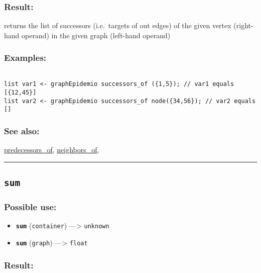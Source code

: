 \documentclass[]{book}
\providecommand{\tightlist}{%
  \setlength{\itemsep}{0pt}\setlength{\parskip}{0pt}}
\theoremstyle{definition}
\theoremstyle{definition}
\theoremstyle{definition}
\theoremstyle{remark}
\begin{document}
\subsubsection{Result:}\label{result-491}

returns the list of successors (i.e.~targets of out edges) of the given
vertex (right-hand operand) in the given graph (left-hand operand)

\subsubsection{Examples:}\label{examples-352}

\begin{verbatim}
 
list var1 <- graphEpidemio successors_of ({1,5}); // var1 equals [{12,45}] 
list var2 <- graphEpidemio successors_of node({34,56}); // var2 equals []
\end{verbatim}

\subsubsection{See also:}\label{see-also-198}

\href{OperatorsNR\#predecessors_of}{predecessors\_of},
\href{OperatorsNR\#neighbors_of}{neighbors\_of},

\begin{center}\rule{0.5\linewidth}{\linethickness}\end{center}

\subsection{\texorpdfstring{\texttt{sum}}{sum}}\label{sum}

\subsubsection{Possible use:}\label{possible-use-509}

\begin{itemize}
\tightlist
\item
  \textbf{\texttt{sum}} (\texttt{container}) ---\textgreater{}
  \texttt{unknown}
\item
  \textbf{\texttt{sum}} (\texttt{graph}) ---\textgreater{}
  \texttt{float}
\end{itemize}

\subsubsection{Result:}\label{result-492}
\end{document}
